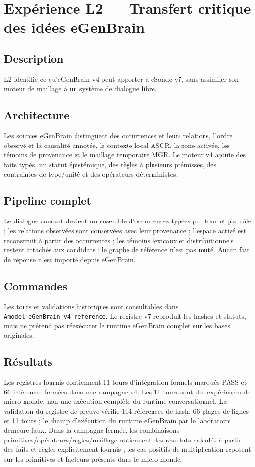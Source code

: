 \documentclass[11pt,a4paper]{report}
\begin{document}
\chapter{Expérience L2 — Transfert critique des idées eGenBrain}
\section{Description}
L2 identifie ce qu'eGenBrain v4 peut apporter à eSonde v7, sans assimiler son moteur de maillage à un système de dialogue libre.
\section{Architecture}
Les sources eGenBrain distinguent des occurrences et leurs relations, l'ordre observé et la causalité annotée, le contexte local ASCR, la zone activée, les témoins de provenance et le maillage temporaire MGR. Le moteur v4 ajoute des faits typés, un statut épistémique, des règles à plusieurs prémisses, des contraintes de type/unité et des opérateurs déterministes.
\section{Pipeline complet}
Le dialogue courant devient un ensemble d'occurrences typées par tour et par rôle ; les relations observées sont conservées avec leur provenance ; l'espace activé est reconstruit à partir des occurrences ; les témoins lexicaux et distributionnels restent attachés aux candidats ; le graphe de référence n'est pas muté. Aucun fait de réponse n'est importé depuis eGenBrain.
\section{Commandes}
Les tours et validations historiques sont consultables dans \texttt{Amodel\_eGenBrain\_v4\_reference}. Le registre v7 reproduit les hashes et statuts, mais ne prétend pas réexécuter le runtime eGenBrain complet sur les bases originales.
\section{Résultats}
Les registres fournis contiennent 11 tours d'intégration formels marqués PASS et 66 inférences fermées dans une campagne v4. Les 11 tours sont des expériences de micro-monde, non une exécution complète du runtime conversationnel. La validation du registre de preuve vérifie 104 références de hash, 66 plages de lignes et 11 tours ; le champ d'exécution du runtime eGenBrain par le laboratoire demeure faux. Dans la campagne fermée, les combinaisons primitives/opérateurs/règles/maillage obtiennent des résultats calculés à partir des faits et règles explicitement fournis ; les cas positifs de multiplication reposent sur les primitives et facteurs présents dans le micro-monde.
\end{document}
